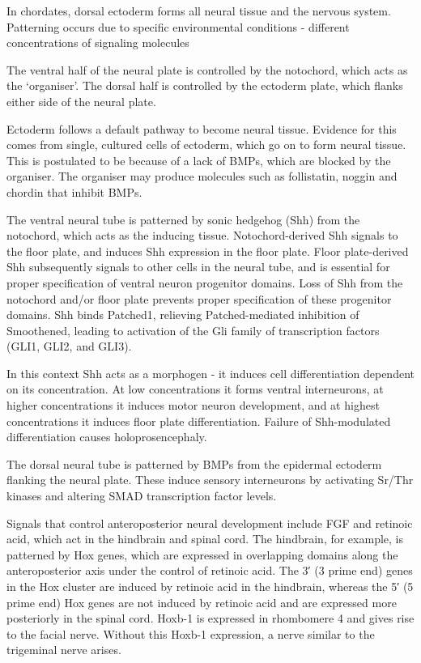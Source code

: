 In chordates, dorsal ectoderm forms all neural tissue and the nervous system. Patterning occurs due to specific environmental conditions - different concentrations of signaling molecules

The ventral half of the neural plate is controlled by the notochord, which acts as the `organiser'. The dorsal half is controlled by the ectoderm plate, which flanks either side of the neural plate.

Ectoderm follows a default pathway to become neural tissue. Evidence for this comes from single, cultured cells of ectoderm, which go on to form neural tissue. This is postulated to be because of a lack of BMPs, which are blocked by the organiser. The organiser may produce molecules such as follistatin, noggin and chordin that inhibit BMPs.

The ventral neural tube is patterned by sonic hedgehog (Shh) from the notochord, which acts as the inducing tissue. Notochord-derived Shh signals to the floor plate, and induces Shh expression in the floor plate. Floor plate-derived Shh subsequently signals to other cells in the neural tube, and is essential for proper specification of ventral neuron progenitor domains. Loss of Shh from the notochord and/or floor plate prevents proper specification of these progenitor domains. Shh binds Patched1, relieving Patched-mediated inhibition of Smoothened, leading to activation of the Gli family of transcription factors (GLI1, GLI2, and GLI3).

In this context Shh acts as a morphogen - it induces cell differentiation dependent on its concentration. At low concentrations it forms ventral interneurons, at higher concentrations it induces motor neuron development, and at highest concentrations it induces floor plate differentiation. Failure of Shh-modulated differentiation causes holoprosencephaly.

The dorsal neural tube is patterned by BMPs from the epidermal ectoderm flanking the neural plate. These induce sensory interneurons by activating Sr/Thr kinases and altering SMAD transcription factor levels.

Signals that control anteroposterior neural development include FGF and retinoic acid, which act in the hindbrain and spinal cord. The hindbrain, for example, is patterned by Hox genes, which are expressed in overlapping domains along the anteroposterior axis under the control of retinoic acid. The 3′ (3 prime end) genes in the Hox cluster are induced by retinoic acid in the hindbrain, whereas the 5′ (5 prime end) Hox genes are not induced by retinoic acid and are expressed more posteriorly in the spinal cord. Hoxb-1 is expressed in rhombomere 4 and gives rise to the facial nerve. Without this Hoxb-1 expression, a nerve similar to the trigeminal nerve arises.

